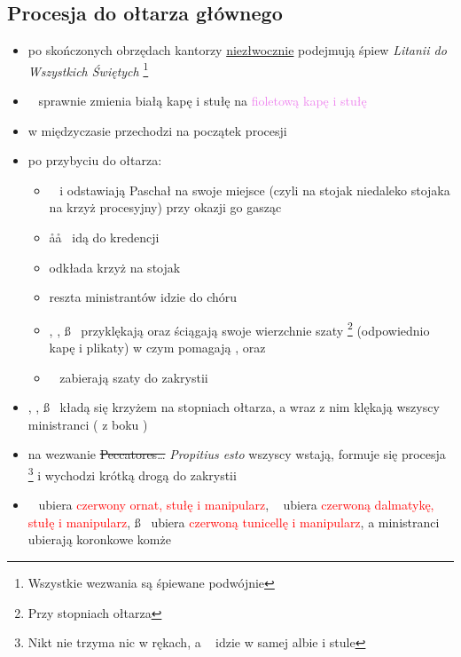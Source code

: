 \subsection{Procesja do ołtarza głównego}
\begin{itemize}
	\item po skończonych obrzędach kantorzy \underline{niezłwocznie} podejmują
	      śpiew \textit{Litanii do Wszystkich Świętych} \footnote{Wszystkie
		      wezwania są śpiewane podwójnie}
	\item \ii~ sprawnie zmienia \textcolor{black!50}{białą kapę i stułę} na
	      \textcolor{violet}{fioletową kapę i stułę}
	\item w międzyczasie \paschal przechodzi na początek procesji
	\item po przybyciu do ołtarza:
	      \begin{itemize}
		      \item \paschal~ i  odstawiają Paschał na swoje miejsce (czyli
		            na stojak niedaleko stojaka na krzyż procesyjny) przy okazji
		            go gasząc
		      \item \aa\aa~ idą do kredencji
		      \item {} odkłada krzyż na stojak
		      \item reszta ministrantów idzie do chóru
		      \item \ii, \dd, \ss~ przyklękają oraz ściągają swoje wierzchnie
		            szaty \footnote{Przy stopniach ołtarza} (odpowiednio kapę i
		            plikaty) w czym pomagają ,  oraz \zz\zz
		      \item \zz\zz~ zabierają szaty do zakrystii
	      \end{itemize}
	\item \ii, \dd, \ss~ kładą się krzyżem na stopniach ołtarza, a wraz z nim
	      klękają wszyscy ministranci ( z boku \dd)
	\item na wezwanie \sout{Peccatores\dots} \textit{Propitius esto} wszyscy
	      wstają, formuje się procesja \footnote{Nikt nie trzyma nic w rękach, a
		      \ii~ idzie w samej albie i stule} i wychodzi krótką drogą do zakrystii
	\item \ii~ ubiera \textcolor{red}{czerwony ornat, stułę i manipularz}, \dd~
	      ubiera \textcolor{red}{czerwoną dalmatykę, stułę i manipularz},
	      \ss~ ubiera \textcolor{red}{czerwoną tunicellę i manipularz}, a
	      ministranci ubierają koronkowe komże
\end{itemize}
